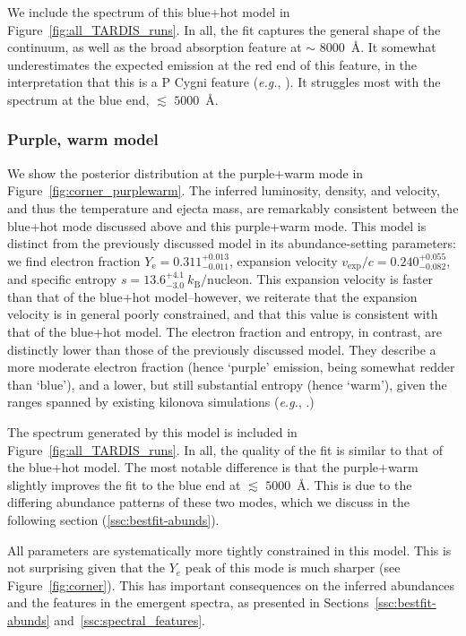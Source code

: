 \documentclass[twocolumn, twocolappendix]{aastex63}
\def\eg{{\it e.g.}}
\begin{document}
We include the spectrum of this blue+hot model in Figure~\ref{fig:all_TARDIS_runs}. In all, the fit captures the general shape of the continuum, as well as the broad absorption feature at $\sim$ $8000$~\AA. It somewhat underestimates the expected emission at the red end of this feature, in the interpretation that this is a P Cygni feature (\eg, \citealt{watson19}). It struggles most with the spectrum at the blue end, $\lesssim$ $ 5000$~\AA.


\subsubsection{Purple, warm model}\label{sssc:purplewarm}

We show the posterior distribution at the purple+warm mode in Figure~\ref{fig:corner_purplewarm}. The inferred luminosity, density, and velocity, and thus the temperature and ejecta mass, are remarkably consistent between the blue+hot mode discussed above and this purple+warm mode. This model is distinct from the previously discussed model in its abundance-setting parameters: we find electron fraction $Y_{\mathrm{e}} = 0.311^{+0.013}_{-0.011}$, expansion velocity $v_{\mathrm{exp}}/c = 0.240^{+0.055}_{-0.082}$, and specific entropy $s = 13.6^{+4.1}_{-3.0}~k_{\mathrm{B}}/\mathrm{nucleon}$. This expansion velocity is faster than that of the blue+hot model--however, we reiterate that the expansion velocity is in general poorly constrained, and that this value is consistent with that of the blue+hot model. The electron fraction and entropy, in contrast, are distinctly lower than those of the previously discussed model. They describe a more moderate electron fraction (hence `purple' emission, being somewhat redder than `blue'), and a lower, but still substantial entropy (hence `warm'), given the ranges spanned by existing kilonova simulations (\eg, \citealt{kawaguchi20}.)  

The spectrum generated by this model is included in Figure~\ref{fig:all_TARDIS_runs}. In all, the quality of the fit is similar to that of the blue+hot model. The most notable difference is that the purple+warm slightly improves the fit to the blue end at $\lesssim$ $5000$~\AA. This is due to the differing abundance patterns of these two modes, which we discuss in the following section (\ref{ssc:bestfit-abunds}).

All parameters are systematically more tightly constrained in this model. This is not surprising given that the $Y_e$ peak of this mode is much sharper (see Figure~\ref{fig:corner}). This has important consequences on the inferred abundances and the features in the emergent spectra, as presented in Sections~\ref{ssc:bestfit-abunds} and~\ref{ssc:spectral_features}.
\end{document}
